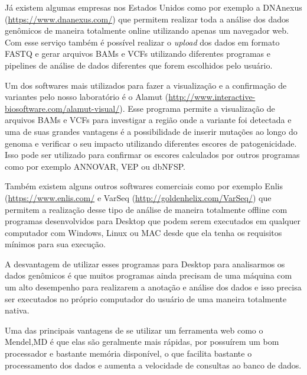 Já existem algumas empresas nos Estados Unidos como por exemplo a DNAnexus (\url{https://www.dnanexus.com/}) que permitem realizar toda a análise dos dados genômicos de maneira totalmente online utilizando apenas um navegador web. Com esse serviço também é possível realizar o \textit{upload} dos dados em formato FASTQ e gerar arquivos BAMs e VCFs utilizando diferentes programas e pipelines de análise de dados diferentes que forem escolhidos pelo usuário.

Um dos softwares mais utilizados para fazer a visualização e a confirmação de variantes pelo nosso laboratório é o Alamut (\url{http://www.interactive-biosoftware.com/alamut-visual/}). Esse programa permite a visualização de arquivos BAMs e VCFs para investigar a região onde a variante foi detectada e uma de suas grandes vantagens é a possibilidade de inserir mutações ao longo do genoma e verificar o seu impacto utilizando diferentes escores de patogenicidade. Isso pode ser utilizado para confirmar os escores calculados por outros programas como por exemplo ANNOVAR, VEP ou dbNFSP.

Também existem alguns outros softwares comerciais como por exemplo Enlis (\url{https://www.enlis.com/} e VarSeq (\url{http://goldenhelix.com/VarSeq/}) que permitem a realização desse tipo de análise de maneira totalmente offline com programas desenvolvidos para Desktop que podem serem executados em qualquer computador com Windows, Linux ou MAC desde que ela tenha os requisitos mínimos para sua execução. 

A desvantagem de utilizar esses programas para Desktop para analisarmos os dados genômicos é que muitos programas ainda precisam de uma máquina com um alto desempenho para realizarem a anotação e análise dos dados e isso precisa ser executados no próprio computador do usuário de uma maneira totalmente nativa. 

Uma das principais vantagens de se utilizar um ferramenta web como o Mendel,MD é que elas são geralmente mais rápidas, por possuírem um bom processador e bastante memória disponível, o que facilita bastante o processamento dos dados e aumenta a velocidade de consultas ao banco de dados.